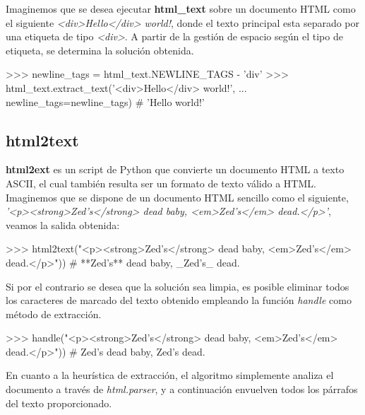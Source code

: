 Imaginemos que se desea ejecutar \textbf{html\_text} sobre un documento HTML como el siguiente
\emph{<div>Hello</div> world!}, donde el texto principal esta separado por una etiqueta de tipo \emph{<div>}.
A partir de la gestión de espacio según el tipo de etiqueta, se determina la solución obtenida.

\begin{Schunk}
  \begin{Soutput}
    >>> newline_tags = html_text.NEWLINE_TAGS - {'div'}
    >>> html_text.extract_text('<div>Hello</div> world!',
    ...                        newline_tags=newline_tags)
    # 'Hello world!'
  \end{Soutput}
\end{Schunk}

\subsection{html2text}
\label{subsec:html2text}

\textbf{html2ext} \cite{html2text} es un script de Python que convierte un documento HTML a texto ASCII, 
el cual también resulta ser un formato de texto válido a HTML. Imaginemos que se dispone de un documento 
HTML sencillo como el siguiente, \emph{'<p><strong>Zed's</strong> dead baby, <em>Zed's</em> dead.</p>'}, 
veamos la salida obtenida:

\begin{Schunk}
  \begin{Soutput}
    >>> html2text("<p><strong>Zed's</strong> dead baby, <em>Zed's</em> dead.</p>"))
    # **Zed's** dead baby, _Zed's_ dead.
  \end{Soutput}
\end{Schunk}

Si por el contrario se desea que la solución sea limpia, es posible eliminar todos los caracteres de
marcado del texto obtenido empleando la función \emph{handle} como método de extracción.

\begin{Schunk}
  \begin{Soutput}
    >>> handle("<p><strong>Zed's</strong> dead baby, <em>Zed's</em> dead.</p>"))
    # Zed's dead baby, Zed's dead.
  \end{Soutput}
\end{Schunk}

En cuanto a la heurística de extracción, el algoritmo simplemente analiza el documento a través de
\emph{html.parser}, y a continuación envuelven todos los párrafos del texto proporcionado.

